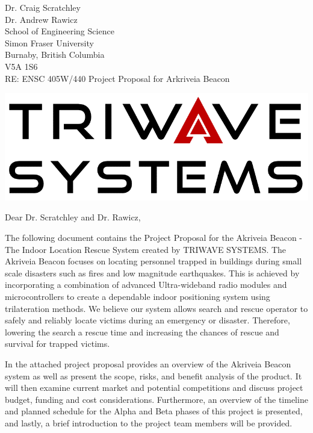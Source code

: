 \documentclass[11pt]{letter}
\date{July 21, 2019}
\begin{document}
\begin{letter}{
Dr. Craig Scratchley\\
Dr. Andrew Rawicz\\
School of Engineering Science\\
Simon Fraser University\\
Burnaby, British Columbia\\
V5A 1S6\\
\bigskip
RE: ENSC 405W/440 Project Proposal for Arkriveia Beacon\\
} 


\begin{center}
\includegraphics[scale=0.3]{./images/logo_W.png}
\end{center}

\opening{Dear Dr. Scratchley and Dr. Rawicz,} 
 
 \bigskip
The following document contains the Project Proposal for the Akriveia Beacon - The Indoor Location Rescue System created by TRIWAVE SYSTEMS. The Akriveia Beacon focuses on locating personnel trapped in buildings during small scale disasters such as fires and low magnitude earthquakes. This is achieved by incorporating a combination of advanced Ultra-wideband radio modules and microcontrollers to create a dependable indoor positioning system using trilateration methods. We believe our system allows search and rescue operator to safely and reliably locate victims during an emergency or disaster. Therefore, lowering the search a rescue time and increasing the chances of rescue and survival for trapped victims.

\bigskip
In the attached project proposal provides an overview of the Akriveia Beacon system  as well as present the scope, risks, and benefit analysis of the product. It will then examine current market and potential competitions and discuss project budget, funding and cost considerations. Furthermore, an overview of the timeline and planned schedule for the Alpha and Beta phases of this project is presented, and lastly, a brief introduction to the project team members will be provided.


\end{letter}
\end{document}
